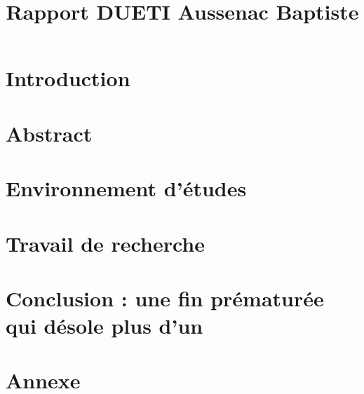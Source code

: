 \documentclass{rapportDUETI}
\title{Rapport DUETI Aussenac Baptiste} %
\begin{document}




        
\fairemarges %
\fairepagedegarde %
\tabledematieres %




\section{Introduction} 



\newpage

\section{Abstract} 



\newpage

\section{Environnement d'études}


\newpage

\section{Travail de recherche}


\newpage

\section{Conclusion : une fin prématurée qui désole plus d'un}


\newpage

\section{Annexe}



\listoffigures
\end{document}
